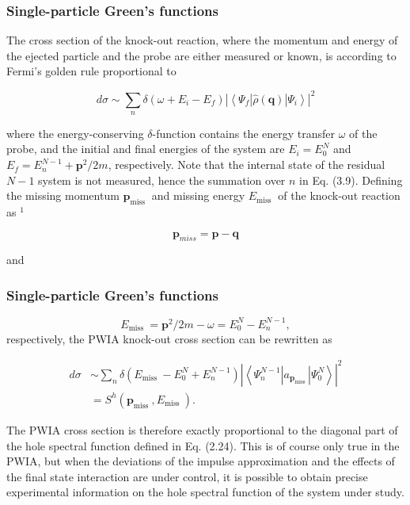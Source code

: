 \documentclass[compress]{beamer}
\begin{document}
\frame
{
\frametitle{Single-particle Green's functions}
\begin{small}
{\scriptsize
The cross section of the knock-out reaction, where the momentum and
energy of the ejected particle and the probe are either measured or
known, is according to Fermi's golden rule proportional to

$$
d \sigma \sim \sum_{n} \delta\left(\omega+E_{i}-E_{f}\right)\left|\left\langle\Psi_{f}|\hat{\rho}(\boldsymbol{q})| \Psi_{i}\right\rangle\right|^{2}
$$

where the energy-conserving $\delta$-function contains the energy transfer $\omega$ of the probe, and the initial and final energies of the system are $E_{i}=E_{0}^{N}$ and $E_{f}=E_{n}^{N-1}+\boldsymbol{p}^{2} / 2 m$, respectively. Note that the internal state of the residual $N-1$ system is not measured, hence the summation over $n$ in Eq. (3.9). Defining the missing momentum $\boldsymbol{p}_{\text {miss }}$ and missing energy $E_{\text {miss }}$ of the knock-out reaction as ${ }^{1}$

$$
\boldsymbol{p}_{m i s s}=\boldsymbol{p}-\boldsymbol{q}
$$

and

}
\end{small}
}
\frame
{
\frametitle{Single-particle Green's functions}
\begin{small}
{\scriptsize
$$
E_{\text {miss }}=\boldsymbol{p}^{2} / 2 m-\omega=E_{0}^{N}-E_{n}^{N-1},
$$
respectively, the PWIA knock-out cross section can be rewritten as

$$
\begin{aligned}
d \sigma & \sim \sum_{n} \delta\left(E_{\text {miss }}-E_{0}^{N}+E_{n}^{N-1}\right)\left|\left\langle\Psi_{n}^{N-1}\left|a_{\boldsymbol{p}_{\text {miss }}}\right| \Psi_{0}^{N}\right\rangle\right|^{2} \\
& =S^{h}\left(\boldsymbol{p}_{\text {miss }}, E_{\text {miss }}\right) .
\end{aligned}
$$

The PWIA cross section is therefore exactly proportional to the diagonal part of the hole spectral function defined in Eq. (2.24). This is of course only true in the PWIA, but when the deviations of the impulse approximation and the effects of the final state interaction are under control, it is possible to obtain precise experimental information on the hole spectral function of the system under study.
}
\end{small}
}
\end{document}
